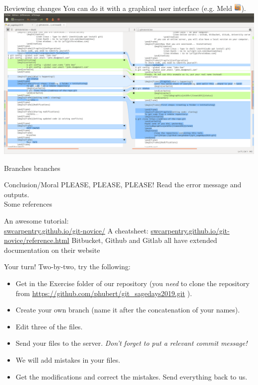 \documentclass{beamer}
\begin{document}
	\begin{frame}{Reviewing changes}
	You can do it with a graphical user interface (e.g. Meld \includegraphics[height=1em]{meld_logo}).\\
	\vspace{1em}
	\includegraphics[width=\linewidth]{meld_ps}
	\end{frame}

	\begin{frame}{Branches}
		branches
	\end{frame}

	\begin{frame}{Conclusion/Moral}
	PLEASE, PLEASE, PLEASE! Read the error message and outputs.\\
	\vspace{1em}
	\pause
	{\Large Some references}
	\begin{thebibliography}{widestlabel}
		 An awesome tutorial:\\ \url{swcarpentry.github.io/git-novice/}
		 A cheatsheet: \url{swcarpentry.github.io/git-novice/reference.html}
		 Bitbucket, Github and Gitlab all have extended documentation on their website
	\end{thebibliography} 
	\end{frame}

	\begin{frame}{Your turn!}
	Two-by-two, try the following:
		\begin{itemize}
			\item Get in the Exercise folder of our repository (you \textit{need} to clone the repository from \url{https://github.com/phubert/git_sagedays2019.git} ).
			\item Create your own branch (name it after the concatenation of your names).
			\item Edit three of the files.
			\item Send your files to the server. \textit{Don't forget to put a relevant commit message!}
			\item We will add mistakes in your files.
			\item Get the modifications and correct the mistakes. Send everything back to us.
		\end{itemize}
	\end{frame}
\end{document}
